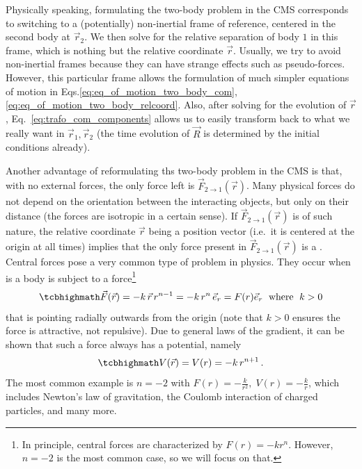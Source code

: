 \documentclass[../class_mech_main.tex]{subfiles}
\begin{document}
Physically speaking, formulating the two-body problem in the CMS corresponds to switching to a (potentially) non-inertial frame of reference, centered in the second body at $\vec{r}_2$. We then solve for the relative separation of body $1$ in this frame, which is nothing but the relative coordinate $\vec{r}$. Usually, we try to avoid non-inertial frames because they can have strange effects such as pseudo-forces. However, this particular frame allows the formulation of much simpler equations of motion in Eqs.\eqref{eq:eq_of_motion_two_body_com}, \eqref{eq:eq_of_motion_two_body_relcoord}. Also, after solving for the evolution of $\vec{r}$, Eq.~\eqref{eq:trafo_com_components} allows us to easily transform back to what we really want in $\vec{r}_1, \vec{r}_2$ (the time evolution of $\vec{R}$ is determined by the initial conditions already).


Another advantage of reformulating ths two-body problem in the CMS is that, with no external forces, the only force left is $\vec{F}_{2 \rightarrow 1}(\vec{r})$. Many physical forces do not depend on the orientation between the interacting objects, but only on their distance (the forces are isotropic in a certain sense). If $\vec{F}_{2 \rightarrow 1}(\vec{r})$ is of such nature, the relative coordinate $\vec{r}$ being a position vector (i.e.~it is centered at the origin at all times) implies that the only force present in $\vec{F}_{2 \rightarrow 1}(\vec{r})$ is a . Central forces pose a very common type of problem in physics. They occur when is a body is subject to a force\footnote{In principle, central forces are characterized by $F(r) = - k r^n$. However, $n = -2$ is the most common case, so we will focus on that.}
\begin{equation}\label{eq:central_force}
	\eqbox{
		\vec{F}(\vec{r}) = - k \, \vec{r} \, r^{n - 1} = - k \, r^n \, \vec{e}_r = F(r) \vec{e}_r
	}
	\; \text{ where } \; k > 0
\end{equation}
that is pointing radially outwards from the origin (note that $k > 0$ ensures the force is attractive, not repulsive). Due to general laws of the gradient, it can be shown that such a force always has a potential, namely
\begin{equation}\label{eq:central_force_potential}
	\eqbox{
		V(\vec{r}) = V(r) = - k \, r^{n + 1}
	}
	\, .
\end{equation}
The most common example is $n = -2$ with $F(r) = - \frac{k}{r^2}, \; V(r) = - \frac{k}{r}$, which includes Newton's law of gravitation, the Coulomb interaction of charged particles, and many more.
\end{document}
